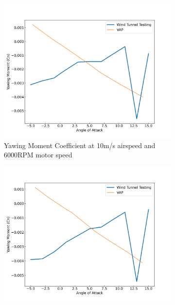 \begin{figure}[H]
    \centering
    \begin{subfigure}[b]{0.467\textwidth}
        \centering
        \includegraphics[width=\textwidth]{05_Results/VAP/pusher/Cn/10ms_6000RPM_Cn.png}
        \caption{Yawing Moment Coefficient at 10m/s airspeed and 6000RPM motor speed}
        \label{fig:VAP_pusher_Cn_10ms_6000}
    \end{subfigure}
    \begin{subfigure}[b]{0.467\textwidth}
        \centering
        \includegraphics[width=\textwidth]{05_Results/VAP/pusher/Cn/10ms_11000RPM_Cn.png}

\end{subfigure}
\end{figure}
